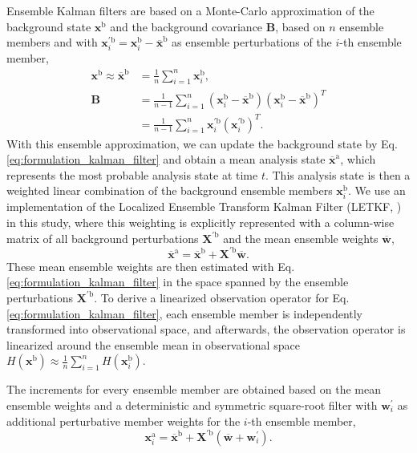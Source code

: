 \documentclass[HESSD, manuscript]{copernicus}
\begin{document}
Ensemble Kalman filters are based on a Monte-Carlo approximation of the background state $\mathbf{x}^\text{b}$ and the background covariance $\mathbf{B}$, based on $n$ ensemble members and with $\mathbf{x}^{\prime\text{b}}_{i}=\mathbf{x}^\text{b}_{i} - \overline{\mathbf{x}}^\text{b}$ as ensemble perturbations of the $i$-th ensemble member,
\begin{align}
	\mathbf{x}^\text{b} \approx \overline{\mathbf{x}}^\text{b} &=
	\frac{1}{n}\sum_{i=1}^{n} \mathbf{x}^\text{b}_{i},\label{eq:ens_approx_mean}\\
	\mathbf{B} &=
	\frac{1}{n-1}\sum_{i=1}^{n} (\mathbf{x}^\text{b}_{i} - \overline{\mathbf{x}}^\text{b})(\mathbf{x}^\text{b}_{i} - \overline{\mathbf{x}}^\text{b})^{T}\label{eq:ens_approx_cov}\\
	&= \frac{1}{n-1}\sum_{i=1}^{n} \mathbf{x}^{\prime\text{b}}_{i} (\mathbf{x}^{\prime\text{b}}_{i})^{T}.\nonumber
\end{align}
With this ensemble approximation, we can update the background state by Eq. \eqref{eq:formulation_kalman_filter} and obtain a mean analysis state $\overline{\mathbf{x}}^\text{a}$, which represents the most probable analysis state at time $t$.
This analysis state is then a weighted linear combination of the background ensemble members $\mathbf{x}^\text{b}_{i}$.
We use an implementation of the Localized Ensemble Transform Kalman Filter (LETKF, \citet{bishop_adaptive_2001,hunt_efficient_2007}) in this study, where this weighting is explicitly represented with a column-wise matrix of all background perturbations $\mathbf{X}^{\prime\text{b}}$ and the mean ensemble weights $\overline{\textbf{w}}$,
\begin{equation}
	\overline{\mathbf{x}}^\text{a} = \overline{\mathbf{x}}^\text{b} + \mathbf{X}^{\prime\text{b}} \overline{\mathbf{w}}.\label{eq:letkf_eq}
\end{equation}
These mean ensemble weights are then estimated with Eq. \eqref{eq:formulation_kalman_filter} in the space spanned by the ensemble perturbations $\mathbf{X}^{\prime\text{b}}$.
To derive a linearized observation operator for Eq. \eqref{eq:formulation_kalman_filter}, each ensemble member is independently transformed into observational space, and afterwards, the observation operator is linearized around the ensemble mean in observational space $H(\mathbf{x}^{\text{b}}) \approx \frac{1}{n}\sum_{i=1}^{n} H(\mathbf{x}^{\text{b}}_{i})$.

The increments for every ensemble member are obtained based on the mean ensemble weights and a deterministic and symmetric square-root filter with $\mathbf{w}^\prime_{i}$ as additional perturbative member weights for the $i$-th ensemble member,
\begin{equation*}
	\mathbf{x}^\text{a}_{i} = \overline{\mathbf{x}}^\text{b} + \mathbf{X}^{\prime\text{b}} (\overline{\mathbf{w}}+\mathbf{w}^\prime_{i}).
\end{equation*}
\end{document}

